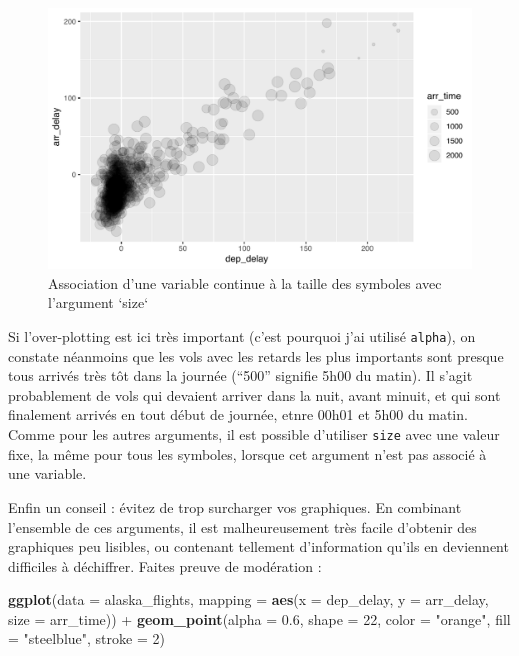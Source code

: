 \documentclass[a4paperpaper,]{article}
\newenvironment{Shaded}{\begin{snugshade}}{\end{snugshade}}
\newcommand{\DataTypeTok}[1]{\textcolor[rgb]{0.00,0.34,0.68}{#1}}
\newcommand{\DecValTok}[1]{\textcolor[rgb]{0.69,0.50,0.00}{#1}}
\newcommand{\FloatTok}[1]{\textcolor[rgb]{0.69,0.50,0.00}{#1}}
\newcommand{\KeywordTok}[1]{\textcolor[rgb]{0.12,0.11,0.11}{\textbf{#1}}}
\newcommand{\NormalTok}[1]{\textcolor[rgb]{0.12,0.11,0.11}{#1}}
\newcommand{\OperatorTok}[1]{\textcolor[rgb]{0.12,0.11,0.11}{#1}}
\newcommand{\StringTok}[1]{\textcolor[rgb]{0.75,0.01,0.01}{#1}}
\theoremstyle{definition}
\theoremstyle{definition}
\theoremstyle{definition}
\theoremstyle{remark}
\begin{document}
\begin{figure}[htpb]

{\centering \includegraphics[width=0.9\linewidth]{figure/sizeplot-1} 

}

\caption{Association d'une variable continue à la taille des symboles avec l'argument `size`}\label{fig:sizeplot}
\end{figure}

Si l'over-plotting est ici très important (c'est pourquoi j'ai utilisé
\texttt{alpha}), on constate néanmoins que les vols avec les retards les
plus importants sont presque tous arrivés très tôt dans la journée
(``500'' signifie 5h00 du matin). Il s'agit probablement de vols qui
devaient arriver dans la nuit, avant minuit, et qui sont finalement
arrivés en tout début de journée, etnre 00h01 et 5h00 du matin. Comme
pour les autres arguments, il est possible d'utiliser \texttt{size} avec
une valeur fixe, la même pour tous les symboles, lorsque cet argument
n'est pas associé à une variable.

Enfin un conseil : évitez de trop surcharger vos graphiques. En
combinant l'ensemble de ces arguments, il est malheureusement très
facile d'obtenir des graphiques peu lisibles, ou contenant tellement
d'information qu'ils en deviennent difficiles à déchiffrer. Faites
preuve de modération :

\begin{Shaded}
\begin{Highlighting}[]
\KeywordTok{ggplot}\NormalTok{(}\DataTypeTok{data =}\NormalTok{ alaska_flights, }\DataTypeTok{mapping =} \KeywordTok{aes}\NormalTok{(}\DataTypeTok{x =}\NormalTok{ dep_delay, }\DataTypeTok{y =}\NormalTok{ arr_delay, }\DataTypeTok{size =}\NormalTok{ arr_time)) }\OperatorTok{+}
\StringTok{  }\KeywordTok{geom_point}\NormalTok{(}\DataTypeTok{alpha =} \FloatTok{0.6}\NormalTok{, }
             \DataTypeTok{shape =} \DecValTok{22}\NormalTok{,}
             \DataTypeTok{color =} \StringTok{"orange"}\NormalTok{,}
             \DataTypeTok{fill =} \StringTok{"steelblue"}\NormalTok{,}
             \DataTypeTok{stroke =} \DecValTok{2}\NormalTok{)}
\end{Highlighting}
\end{Shaded}
\end{document}
